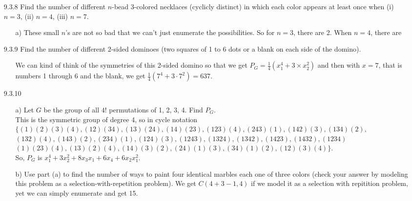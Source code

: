 \documentclass[12pt]{article}
\begin{document}
\begin{enumerate}
\item[9.3.8] Find the number of different $n$-bead 3-colored necklaces (cyclicly distinct) in which each color appears at least once when (i) $n = 3$, (ii) $n = 4$, (iii) $n = 7$.
\begin{enumerate}
\item[a)] These small $n$'s are not so bad that we can't just enumerate the possibilities.
So for $n = 3$, there are 2. When $n = 4$, there are 
\end{enumerate}

\item[9.3.9] Find the number of different 2-sided dominoes (two squares of 1 to 6 dots or a blank on each side of the domino).
\begin{enumerate}
\item[] We can kind of think of the symmetries of this 2-sided domino so that we get
$P_G = \frac{1}{4}(x_1^4 + 3 \times x_2^2)$ and then with $x = 7$, that is numbers
1 through 6 and the blank, we get $\frac{1}{4}(7^4 + 3\cdot 7^2) = 637$.
\end{enumerate}

\item[9.3.10] 
\begin{enumerate}
\item[a)] Let $G$ be the group of all $4!$ permutations of 1, 2, 3, 4. Find $P_G$. \\
This is the symmetric group of degree 4, so in cycle notation \\
$\{(1)(2)(3)(4), (12)(34), (13)(24), (14)(23), (123)(4), (243)(1), (142)(3), (134)(2),$\\
$(132)(4), (143)(2), (234)(1), (124)(3), (1243), (1324), (1342), (1423), (1432), (1234)$\\
$(1)(23)(4), (13)(2)(4), (14)(3)(2), (24)(1)(3), (34)(1)(2), (12)(3)(4)\}$. \\
So, $P_G$ is $x_1^4 + 3x_2^2 + 8x_3x_1 + 6x_4 + 6x_2x_1^2$.
\item[b)] Use part (a) to find the number of ways to paint four identical marbles each one of three colors (check your answer by modeling this problem as a selection-with-repetition problem).
We get $C(4+3-1, 4)$ if we model it as a selection with repitition problem, yet
we can simply enumerate and get 15.
\end{enumerate}


\end{enumerate}
\end{document}
